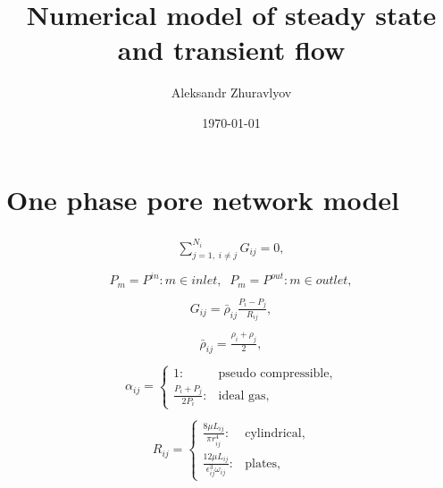 \documentclass[a4paper,12pt]{extreport}
\author{Aleksandr Zhuravlyov}
\title{Numerical model of steady state and transient flow}
\date{\today}
\begin{document}

    \section*{One phase pore network model}

    \begin{eqnarray}
    \label{one_phase} 
    \begin{gathered}
    \sum^{N_{i}}_{j=1, \; i\neq j} G_{ij} = 0,
    \end{gathered}
    \end{eqnarray}
    \begin{eqnarray}
    \begin{gathered}
    \label{press_bound}
    P_{m} = P^{in}   : m \in inlet, \;\;
    P_{m} = P^{out}   :m \in outlet,
    \end{gathered}
    \end{eqnarray}
    \begin{eqnarray}
    \begin{gathered}
    \label{eq:mass_flux_simple_pnm}
    G_{ij} = \bar{\rho}_{ij} \frac{P_{i} - P_{j}}{R_{ij}},
    \end{gathered}
    \end{eqnarray}
     \begin{eqnarray}
    \begin{gathered}
    \bar{\rho}_{ij} = \frac{\rho_{i}+\rho_{j}}{2},
    \end{gathered}
    \end{eqnarray}
    \begin{eqnarray}
        \begin{gathered}
            \alpha_{ij} =\begin{cases}
                             1: &\text{pseudo compressible},\\
                             \frac{P_i + P_j}{2P_i}: &\text{ideal gas},
            \end{cases}
        \end{gathered}
    \end{eqnarray}
\begin{eqnarray}
\begin{gathered}
R_{ij} =\begin{cases}
\frac{8 \mu L_{ij}}{\pi r_{ij}^{4}}: &\text{cylindrical},\\
\frac{12 \mu L_{ij}}{\epsilon_{ij}^{3} \omega_{ij}}: &\text{plates},
\end{cases}
\end{gathered}
\end{eqnarray}
\end{document}
